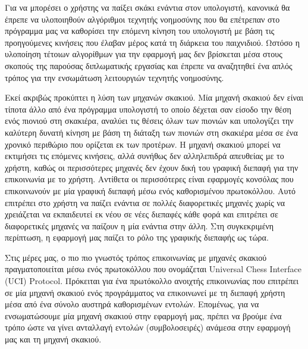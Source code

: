 Για να μπορέσει ο χρήστης να παίξει σκάκι ενάντια στον υπολογιστή, κανονικά θα έπρεπε να υλοποιηθούν αλγόριθμοι τεχνητής νοημοσύνης που θα επέτρεπαν στο πρόγραμμα μας να καθορίσει την επόμενη κίνηση του υπολογιστή με βάση τις προηγούμενες κινήσεις που έλαβαν μέρος κατά τη διάρκεια του παιχνιδιού. Ωστόσο η υλοποίηση τέτοιων αλγορίθμων για την εφαρμογή μας δεν βρίσκεται μέσα στους σκοπούς της παρούσας διπλωματικής εργασίας και έπρεπε να αναζητηθεί ένα απλός τρόπος για την ενσωμάτωση λειτουργιών τεχνητής νοημοσύνης. 


Εκεί ακριβώς προκύπτει η λύση των μηχανών σκακιού. Μία μηχανή σκακιού δεν είναι τίποτα άλλο από ένα πρόγραμμα υπολογιστή το οποίο δέχεται σαν είσοδο την θέση ενός πιονιού στη σκακιέρα, αναλύει τις θέσεις όλων των πιονιών και υπολογίζει την καλύτερη δυνατή κίνηση με βάση τη διάταξη των πιονιών στη σκακιέρα μέσα σε ένα χρονικό περιθώριο που ορίζεται εκ των προτέρων. Η μηχανή σκακιού μπορεί να εκτιμήσει τις επόμενες κινήσεις, αλλά συνήθως δεν αλληλεπιδρά απευθείας με το χρήστη, καθώς οι περισσότερες μηχανές δεν έχουν δική του γραφική διεπαφή για την επικοινωνία με το χρήστη. Αντίθετα οι περισσότερες είναι εφαρμογές κονσόλας που επικοινωνούν με μία γραφική διεπαφή μέσω ενός καθορισμένου πρωτοκόλλου. Αυτό επιτρέπει στο χρήστη να παίζει ενάντια σε πολλές διαφορετικές μηχανές χωρίς να χρειάζεται να εκπαιδευτεί εκ νέου σε νέες διεπαφές κάθε φορά και επιτρέπει σε διαφορετικές μηχανές να παίζουν η μία ενάντια στην άλλη. Στη συγκεκριμένη περίπτωση, η εφαρμογή μας παίζει το ρόλο της γραφικής διεπαφής ως τώρα. 


Στις μέρες μας, ο πιο πιο γνωστός τρόπος επικοινωνίας με μηχανές σκακιού πραγματοποιείται μέσω ενός πρωτοκόλλου που ονομάζεται Universal Chess Interface (UCI) Protocol. Πρόκειται για ένα πρωτόκολλο ανοιχτής επικοινωνίας που επιτρέπει σε μία μηχανή σκακιού ενός προγράμματος να επικοινωνεί με τη διεπαφή χρήστη μέσα από ένα σύνολο αυστηρά καθορισμένων εντολών. Επομένως, για να ενσωματώσουμε μία μηχανή σκακιού στην εφαρμογή μας, πρέπει να βρούμε ένα τρόπο ώστε να γίνει ανταλλαγή εντολών (συμβολοσειρές) ανάμεσα στην εφαρμογή μας και τη μηχανή σκακιού. 


